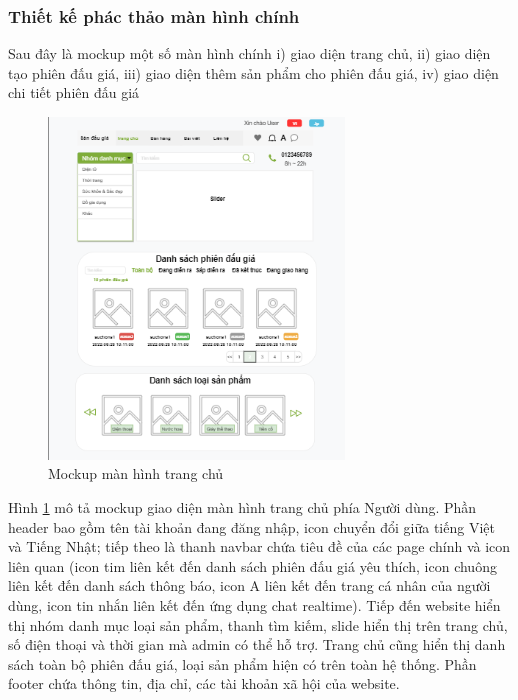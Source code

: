 \documentclass{article}
\begin{document}
\subsubsection{Thiết kế phác thảo màn hình chính}
Sau đây là mockup một số màn hình chính i) giao diện trang chủ, ii) giao diện tạo phiên đấu giá, iii) giao diện thêm sản phẩm cho phiên đấu giá, iv) giao diện chi tiết phiên đấu giá
\begin{figure}[H]
    \centering
    \includegraphics[width=7.87cm,height=9.07cm]{images/homepage.png}
    \caption{Mockup màn hình trang chủ}
    \label{hinh48}
\end{figure}
Hình \ref{hinh48} mô tả mockup giao diện màn hình trang chủ phía Người dùng. Phần header bao gồm tên tài khoản đang đăng nhập, icon chuyển đổi giữa tiếng Việt và Tiếng Nhật; tiếp theo là thanh navbar chứa tiêu đề của các page chính và icon liên quan (icon tim liên kết đến danh sách phiên đấu giá yêu thích, icon chuông liên kết đến danh sách thông báo, icon A liên kết đến trang cá nhân của người dùng, icon tin nhắn liên kết đến ứng dụng chat realtime). Tiếp đến website hiển thị nhóm danh mục loại sản phẩm, thanh tìm kiếm, slide hiển thị trên trang chủ, số điện thoại và thời gian mà admin có thể hỗ trợ. Trang chủ cũng hiển thị danh sách toàn bộ phiên đấu giá, loại sản phẩm hiện có trên toàn hệ thống. Phần footer chứa thông tin, địa chỉ, các tài khoản xã hội của website.
\end{document}
